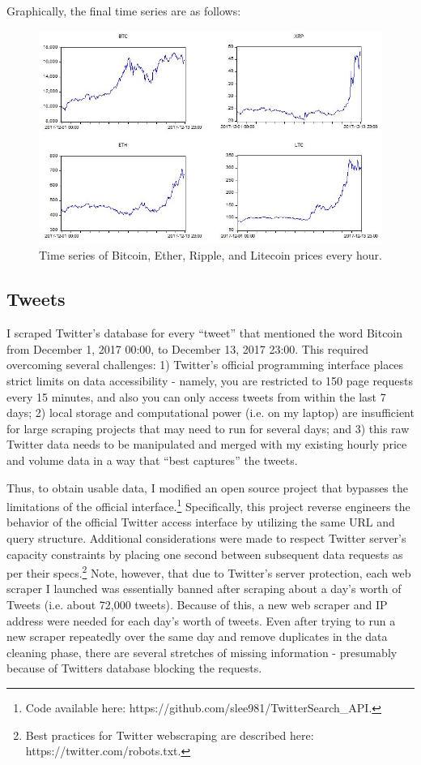 \documentclass{article}
\begin{document}
	Graphically, the final time series are as follows: 
	\begin{figure}[H]
	\centering
	\includegraphics[width = .9\textwidth]{priceSeries.JPG}
	\caption{Time series of Bitcoin, Ether, Ripple, and Litecoin prices every hour.}
	\end{figure}
	
	
	\subsection{Tweets}
	I scraped Twitter's database for every ``tweet'' that mentioned the word Bitcoin from December 1, 2017 00:00, to December 13, 2017 23:00. This required overcoming several challenges: 1) Twitter's official programming interface places strict limits on data accessibility - namely, you are restricted to 150 page requests every 15 minutes, and also you can only access tweets from within the last 7 days; 2) local storage and computational power (i.e. on my laptop) are insufficient for large scraping projects that may need to run for several days; and 3) this raw Twitter data needs to be manipulated and merged with my existing hourly price and volume data in a way that ``best captures'' the tweets. 
	
	Thus, to obtain usable data, I modified an open source project that bypasses the limitations of the official interface.\footnote{Code available here: https://github.com/slee981/TwitterSearch\_API.} Specifically, this project reverse engineers the behavior of the official Twitter access interface by utilizing the same URL and query structure. Additional considerations were made to respect Twitter server's capacity constraints by placing one second between subsequent data requests as per their specs.\footnote{Best practices for Twitter webscraping are described here: https://twitter.com/robots.txt.} Note, however, that due to Twitter's server protection, each web scraper I launched was essentially banned after scraping about a day's worth of Tweets (i.e. about 72,000 tweets). Because of this, a new web scraper and IP address were needed for each day's worth of tweets. Even after trying to run a new scraper repeatedly over the same day and remove duplicates in the data cleaning phase, there are several stretches of missing information - presumably because of Twitters database blocking the requests. 
	
\end{document}
